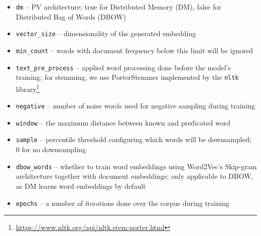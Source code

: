 \begin{itemize}

  \item \texttt{dm} --  PV architecture; true for Distributed Memory (DM),
    false for Distributed Bag of Words (DBOW)

  \item \texttt{vector\_size} -- dimensionality of the generated embedding

  \item \texttt{min\_count} -- words with document frequency below this limit
    will be ignored

  \item \texttt{text\_pre\_process} -- applied word processing done before the
    model's training; for stemming, we use PorterStemmer implemented by the \texttt{nltk}
    library\footnote{\url{https://www.nltk.org/api/nltk.stem.porter.html}}

  \item \texttt{negative} -- number of noise words used for negative sampling
    during training

  \item \texttt{window} -- the maximum distance between known and predicated
    word

  \item \texttt{sample} -- percentile threshold configuring which words will be
    downsampled; 0 for no downsampling


  \item \texttt{dbow\_words} -- whether to train word embeddings using
    Word2Vec's \citep{mikolov2013efficient} Skip-gram architecture together
    with document embeddings; only applicable to DBOW, as DM learns word embeddings by default

  \item \texttt{epochs} -- a number of iterations done over the corpus during
    training

\end{itemize}

